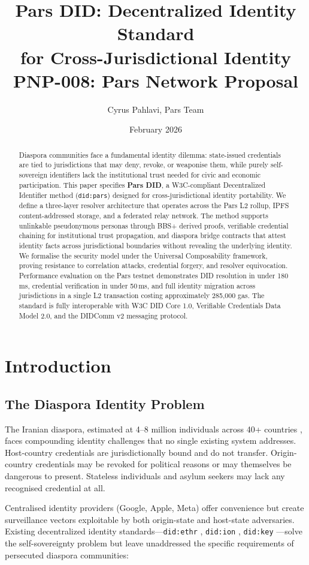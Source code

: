 \documentclass[11pt,a4paper]{article}
\title{Pars DID: Decentralized Identity Standard\\for Cross-Jurisdictional Identity\\[0.5em]\large PNP-008: Pars Network Proposal}
\author{Cyrus Pahlavi, Pars Team}
\date{February 2026}
\begin{document}
\parscoverpage


\begin{abstract}
Diaspora communities face a fundamental identity dilemma: state-issued credentials
are tied to jurisdictions that may deny, revoke, or weaponise them, while purely
self-sovereign identifiers lack the institutional trust needed for civic and economic
participation. This paper specifies \textbf{Pars DID}, a W3C-compliant Decentralized
Identifier method (\texttt{did:pars}) designed for cross-jurisdictional identity
portability. We define a three-layer resolver architecture that operates across the
Pars L2 rollup, IPFS content-addressed storage, and a federated relay network. The
method supports unlinkable pseudonymous personas through BBS+ derived proofs,
verifiable credential chaining for institutional trust propagation, and diaspora
bridge contracts that attest identity facts across jurisdictional boundaries without
revealing the underlying identity. We formalise the security model under the Universal
Composability framework, proving resistance to correlation attacks, credential forgery,
and resolver equivocation. Performance evaluation on the Pars testnet demonstrates
DID resolution in under 180\,ms, credential verification in under 50\,ms, and
full identity migration across jurisdictions in a single L2 transaction costing
approximately 285{,}000 gas. The standard is fully interoperable with W3C DID Core
1.0, Verifiable Credentials Data Model 2.0, and the DIDComm v2 messaging protocol.
\end{abstract}

\section{Introduction}

\subsection{The Diaspora Identity Problem}

The Iranian diaspora, estimated at 4--8 million individuals across 40+ countries
\cite{bbc-diaspora}, faces compounding identity challenges that no single existing
system addresses. Host-country credentials are jurisdictionally bound and do not
transfer. Origin-country credentials may be revoked for political reasons or may
themselves be dangerous to present. Stateless individuals and asylum seekers may
lack any recognised credential at all.

Centralised identity providers (Google, Apple, Meta) offer convenience but create
surveillance vectors exploitable by both origin-state and host-state adversaries.
Existing decentralized identity standards---\texttt{did:ethr} \cite{did-ethr},
\texttt{did:ion} \cite{did-ion}, \texttt{did:key} \cite{did-key}---solve the
self-sovereignty problem but leave unaddressed the specific requirements of
persecuted diaspora communities:
\end{document}
